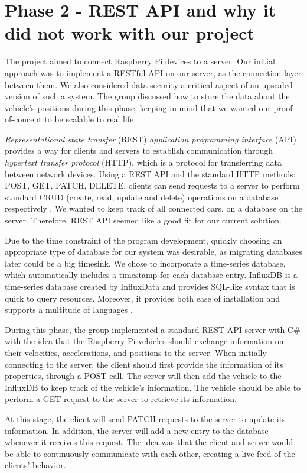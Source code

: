 
\section{Phase 2 - REST API and why it did not work with our project}\label{phase2}
The project aimed to connect Raspberry Pi devices to a server.  Our initial approach was to implement a RESTful API on our server, as the connection layer between them. We also considered data security a critical aspect of an upscaled version of such a system. The group discussed how to store the data about the vehicle's positions during this phase, keeping in mind that we wanted our proof-of-concept to be scalable to real life.

\emph{Representational state transfer} (REST) \emph{application programming interface} (API) provides a way for clients and servers to establish communication through \emph{hypertext transfer protocol} (HTTP), which is a protocol for transferring data between network devices. Using a REST API and the standard HTTP methods; POST, GET, PATCH, DELETE, clients can send requests to a server to perform standard CRUD (create, read, update and delete) operations on a database respectively \parencite{rest_api}. We wanted to keep track of all connected cars, on a database on the server. Therefore, REST API seemed like a good fit for our current solution.

Due to the time constraint of the program development, quickly choosing an appropriate type of database for our system was desirable, as migrating databases later could be a big timesink. We chose to incorporate a time-series database, which automatically includes a timestamp for each database entry. InfluxDB is a time-series database created by InfluxData and provides SQL-like syntax that is quick to query resources. Moreover, it provides both ease of installation and supports a multitude of languages \parencite{influxdb}.

During this phase, the group implemented a standard REST API server with C\# with the idea that the Raspberry Pi vehicles should exchange information on their velocities, accelerations, and positions to the server. When initially connecting to the server, the client should first provide the information of its properties, through a POST call. The server will then add the vehicle to the InfluxDB to keep track of the vehicle's information. The vehicle should be able to perform a GET request to the server to retrieve its information.

At this stage, the client will send PATCH requests to the server to update its information. In addition, the server will add a new entry to the database whenever it receives this request. The idea was that the client and server would be able to continuously communicate with each other, creating a live feed of the clients' behavior.

